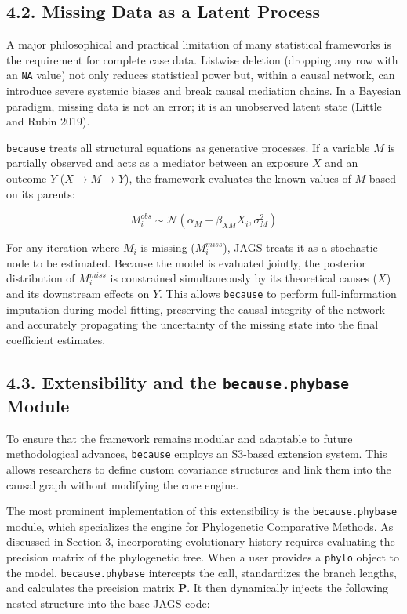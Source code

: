 \documentclass[
]{article}
\begin{document}
\subsection{4.2. Missing Data as a Latent Process}\label{missing-data-as-a-latent-process}

A major philosophical and practical limitation of many statistical frameworks is the requirement for complete case data. Listwise deletion (dropping any row with an \texttt{NA} value) not only reduces statistical power but, within a causal network, can introduce severe systemic biases and break causal mediation chains. In a Bayesian paradigm, missing data is not an error; it is an unobserved latent state (Little and Rubin 2019).

\texttt{because} treats all structural equations as generative processes. If a variable \(M\) is partially observed and acts as a mediator between an exposure \(X\) and an outcome \(Y\) (\(X \rightarrow M \rightarrow Y\)), the framework evaluates the known values of \(M\) based on its parents:

\[ M_i^{obs} \sim \mathcal{N}(\alpha_M + \beta_{XM} X_i, \sigma^2_M) \]

For any iteration where \(M_i\) is missing (\(M_i^{miss}\)), JAGS treats it as a stochastic node to be estimated. Because the model is evaluated jointly, the posterior distribution of \(M_i^{miss}\) is constrained simultaneously by its theoretical causes (\(X\)) and its downstream effects on \(Y\). This allows \texttt{because} to perform full-information imputation during model fitting, preserving the causal integrity of the network and accurately propagating the uncertainty of the missing state into the final coefficient estimates.

\subsection{\texorpdfstring{4.3. Extensibility and the \texttt{because.phybase} Module}{4.3. Extensibility and the because.phybase Module}}\label{extensibility-and-the-because.phybase-module}

To ensure that the framework remains modular and adaptable to future methodological advances, \texttt{because} employs an S3-based extension system. This allows researchers to define custom covariance structures and link them into the causal graph without modifying the core engine.

The most prominent implementation of this extensibility is the \texttt{because.phybase} module, which specializes the engine for Phylogenetic Comparative Methods. As discussed in Section 3, incorporating evolutionary history requires evaluating the precision matrix of the phylogenetic tree. When a user provides a \texttt{phylo} object to the model, \texttt{because.phybase} intercepts the call, standardizes the branch lengths, and calculates the precision matrix \(\mathbf{P}\). It then dynamically injects the following nested structure into the base JAGS code:
\end{document}
